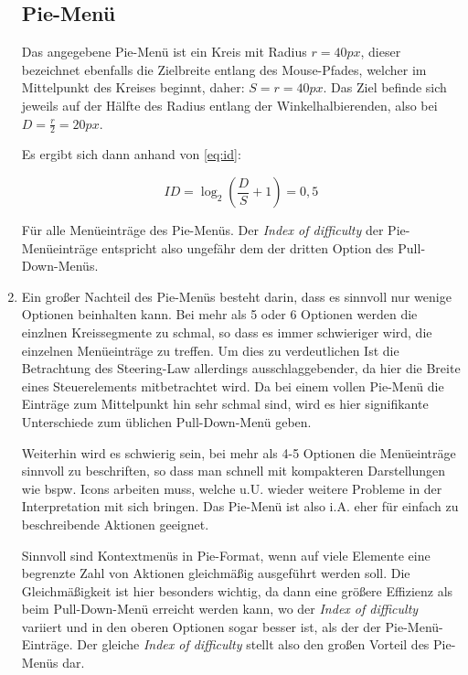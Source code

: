 \documentclass[a4paper,10pt]{article}
\begin{document}
\begin{enumerate}
\subsection*{Pie-Menü}

Das angegebene Pie-Menü ist ein Kreis mit Radius $r = 40px$, dieser bezeichnet ebenfalls die Zielbreite entlang des Mouse-Pfades, welcher im Mittelpunkt des Kreises beginnt, daher: $S = r = 40px$. Das Ziel befinde sich jeweils auf der Hälfte des Radius entlang der Winkelhalbierenden, also bei $D = \frac{r}{2} = 20px$.

Es ergibt sich dann anhand von \eqref{eq:id}:

\begin{equation}
ID = \log_{2} \left( \frac{D}{S} + 1 \right) = 0,5
\end{equation}

Für alle Menüeinträge des Pie-Menüs. Der \textit{Index of difficulty} der Pie-Menüeinträge entspricht also ungefähr dem der dritten Option des Pull-Down-Menüs.

\item Ein großer Nachteil des Pie-Menüs besteht darin, dass es sinnvoll nur wenige Optionen beinhalten kann. Bei mehr als 5 oder 6 Optionen werden die einzlnen Kreissegmente zu schmal, so dass es immer schwieriger wird, die einzelnen Menüeinträge zu treffen. Um dies zu verdeutlichen Ist die Betrachtung des Steering-Law allerdings ausschlaggebender, da hier die Breite eines Steuerelements mitbetrachtet wird. Da bei einem vollen Pie-Menü die Einträge zum Mittelpunkt hin sehr schmal sind, wird es hier signifikante Unterschiede zum üblichen Pull-Down-Menü geben.

Weiterhin wird es schwierig sein, bei mehr als 4-5 Optionen die Menüeinträge sinnvoll zu beschriften, so dass man schnell mit kompakteren Darstellungen wie bspw. Icons arbeiten muss, welche u.U. wieder weitere Probleme in der Interpretation mit sich bringen. Das Pie-Menü ist also i.A. eher für einfach zu beschreibende Aktionen geeignet.

Sinnvoll sind Kontextmenüs in Pie-Format, wenn auf viele Elemente eine begrenzte Zahl von Aktionen gleichmäßig ausgeführt werden soll. Die Gleichmäßigkeit ist hier besonders wichtig, da dann eine größere Effizienz als beim Pull-Down-Menü erreicht werden kann, wo der \textit{Index of difficulty} variiert und in den oberen Optionen sogar besser ist, als der der Pie-Menü-Einträge. Der gleiche \textit{Index of difficulty} stellt also den großen Vorteil des Pie-Menüs dar.


\end{enumerate}
\end{document}
